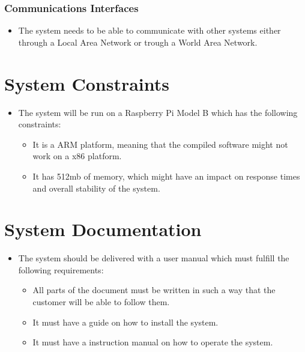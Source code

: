 \subsubsection{Communications Interfaces}

\begin{itemize}
\item The system needs to be able to communicate with other systems either through a Local Area Network or trough a World Area Network.
\end{itemize}

\newpage
\section{System Constraints}

\begin{itemize}
\item The system will be run on a Raspberry Pi Model B which has the following constraints:
  \begin{itemize}
  \item It is a ARM platform, meaning that the compiled software might not work on a x86 platform.
  \item It has 512mb of memory, which might have an impact on response times and overall stability of the system.
  \end{itemize}
  \end{itemize}

\section{System Documentation}

\begin{itemize}
\item The system should be delivered with a user manual which must fulfill the following requirements:
  \begin{itemize}
  \item All parts of the document must be written in such a way that the customer will be able to follow them.
  \item It must have a guide on how to install the system.
  \item It must have a instruction manual on how to operate the system.
  \end{itemize}
\end{itemize}
